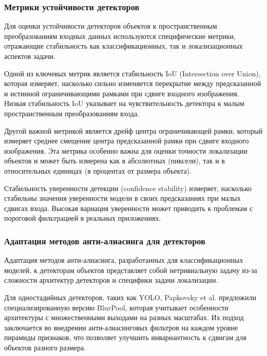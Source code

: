 \subsubsection{Метрики устойчивости детекторов}
\label{review:detectors:metrics}

Для оценки устойчивости детекторов объектов к пространственным преобразованиям входных данных используются специфические метрики, отражающие стабильность как классификационных, так и локализационных аспектов задачи.

Одной из ключевых метрик является стабильность IoU (Intersection over Union), которая измеряет, насколько сильно изменяется перекрытие между предсказанной и истинной ограничивающими рамками при сдвиге входного изображения. Низкая стабильность IoU указывает на чувствительность детектора к малым пространственным преобразованиям входа.

Другой важной метрикой является дрейф центра ограничивающей рамки, который измеряет среднее смещение центра предсказанной рамки при сдвиге входного изображения. Эта метрика особенно важна для оценки точности локализации объектов и может быть измерена как в абсолютных (пиксели), так и в относительных единицах (в процентах от размера объекта).

Стабильность уверенности детекции (confidence stability) измеряет, насколько стабильны значения уверенности модели в своих предсказаниях при малых сдвигах входа. Высокая вариация уверенности может приводить к проблемам с пороговой фильтрацией в реальных приложениях.

\subsubsection{Адаптация методов анти-алиасинга для детекторов}
\label{review:detectors:adaptation}

Адаптация методов анти-алиасинга, разработанных для классификационных моделей, к детекторам объектов представляет собой нетривиальную задачу из-за сложности архитектур детекторов и специфики задачи локализации.

Для одностадийных детекторов, таких как YOLO, Papkovsky et al. \cite{papkovsky2023shift} предложили специализированную версию BlurPool, которая учитывает особенности архитектуры с множественными выходами на разных масштабах. Их подход заключается во внедрении анти-алиасинговых фильтров на каждом уровне пирамиды признаков, что позволяет улучшить инвариантность к сдвигам для объектов разного размера.

